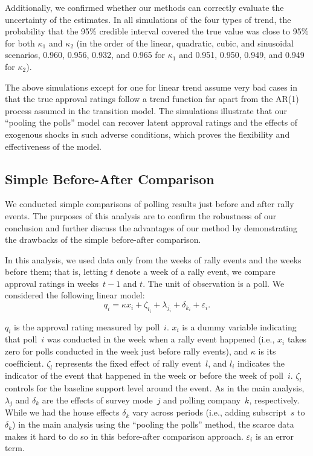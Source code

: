 \documentclass[12pt,letterpaper]{scrartcl}
\begin{document}
Additionally, we confirmed whether our methods can correctly evaluate the uncertainty of the estimates. In all simulations of the four types of trend, the probability that the 95\% credible interval covered the true value was close to 95\% for both $\kappa _{1}$ and $\kappa _{2}$ (in the order of the linear, quadratic, cubic, and sinusoidal scenarios, 0.960, 0.956, 0.932, and 0.965 for $\kappa _{1}$ and 0.951, 0.950, 0.949, and 0.949 for $\kappa _{2}$).

The above simulations except for one for linear trend assume very bad cases in that the true approval ratings follow a trend function far apart from the AR(1) process assumed in the transition model. The simulations illustrate that our ``pooling the polls'' model can recover latent approval ratings and the effects of exogenous shocks in such adverse conditions, which proves the flexibility and effectiveness of the model.

\subsection{Simple Before-After Comparison}\label{app:subsec:before-after}

We conducted simple comparisons of polling results just before and after rally events. The purposes of this analysis are to confirm the robustness of our conclusion and further discuss the advantages of our method by demonstrating the drawbacks of the simple before-after comparison.

In this analysis, we used data only from the weeks of rally events and the weeks before them; that is, letting $t$ denote a week of a rally event, we compare approval ratings in weeks~$t-1$ and $t$. The unit of observation is a poll. We considered the following linear model:
\begin{equation}
q_{i}=\kappa x_{i}+\zeta _{l_{i}}+\lambda _{j_{i}}+\delta _{k_{i}}+\varepsilon _{i}.\label{before-after_model}
\end{equation}

$q_{i}$ is the approval rating measured by poll~$i$. $x_{i}$ is a dummy variable indicating that poll~$i$ was conducted in the week when a rally event happened (i.e., $x_{i}$ takes zero for polls conducted in the week just before rally events), and $\kappa $ is its coefficient. $\zeta _{l}$ represents the fixed effect of rally event~$l$, and $l_{i}$ indicates the indicator of the event that happened in the week or before the week of poll~$i$. $\zeta _{l}$ controls for the baseline support level around the event. As in the main analysis, $\lambda _{j}$ and $\delta _{k}$ are the effects of survey mode~$j$ and polling company~$k$, respectively. While we had the house effects $\delta _{k}$ vary across periods (i.e., adding subscript~$s$ to $\delta _{k}$) in the main analysis using the ``pooling the polls'' method, the scarce data makes it hard to do so in this before-after comparison approach. $\varepsilon _{i}$ is an error term.
\end{document}
